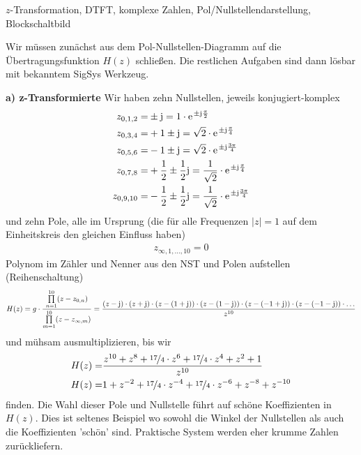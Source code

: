 \begin{Werkzeug}
$z$-Transformation, DTFT, komplexe Zahlen, Pol/Nullstellendarstellung, Blockschaltbild
\end{Werkzeug}
\begin{Ansatz}
Wir müssen zunächst aus dem
Pol-Nullstellen-Diagramm auf die Übertragungsfunktion $H(z)$ schließen. Die
restlichen Aufgaben sind dann lösbar mit bekanntem SigSys Werkzeug.
\end{Ansatz}
%
\begin{ExCalc}
%
\textbf{a) z-Transformierte}
%
Wir haben zehn Nullstellen, jeweils konjugiert-komplex
\begin{align}
z_{0,1,2} =& \pm \im = 1 \cdot \e^{\pm \im \frac{\pi}{2}}\\
z_{0,3,4} =& +1 \pm \im =  \sqrt{2} \cdot \e^{\pm \im \frac{\pi}{4}}\\
z_{0,5,6} =& -1 \pm \im = \sqrt{2} \cdot \e^{\pm \im \frac{3\pi}{4}}\\
z_{0,7,8} =& +\frac{1}{2} \pm \frac{1}{2}\im = \frac{1}{\sqrt{2}} \cdot \e^{\pm \im \frac{\pi}{4}}\\
z_{0,9,10} =& -\frac{1}{2} \pm \frac{1}{2}\im = \frac{1}{\sqrt{2}} \cdot \e^{\pm \im \frac{3\pi}{4}}
\end{align}
und zehn Pole, alle im Ursprung (die für alle Frequenzen $|z|=1$ auf dem
Einheitskreis den gleichen Einfluss haben)
\begin{align}
z_{\infty,1,...,10} = 0
\end{align}
Polynom im Zähler und Nenner aus den NST und Polen aufstellen (Reihenschaltung)
\begin{align}
H(z) = g\cdot
\frac
{\prod\limits_{n=1}^{10} (z-z_{0,n})}
{\prod\limits_{m=1}^{10} (z-z_{\infty,m})} =
\frac{
(z-\im)\cdot
(z+\im)\cdot
(z-(1 + \im))\cdot
(z-(1 - \im))\cdot
(z-(-1 + \im))\cdot
(z-(-1 - \im))\cdot
\dots
}{z^{10}}
\end{align}
und mühsam ausmultiplizieren, bis wir
\begin{align}
H(z) =& \frac{z^{10} + z^8    + \nicefrac{17}{4}\cdot z^6     + \nicefrac{17}{4}\cdot z^4    + z^2    + 1}{z^{10}}\\
H(z) =& 1            + z^{-2} + \nicefrac{17}{4}\cdot z^{-4}  + \nicefrac{17}{4}\cdot z^{-6} + z^{-8} + z^{-10}
\end{align}
finden.
%
Die Wahl dieser Pole und Nullstelle führt auf schöne Koeffizienten in
$H(z)$. Dies ist seltenes Beispiel wo sowohl die Winkel der Nullstellen als auch
die Koeffizienten 'schön' sind. Praktische System werden eher krumme Zahlen
zurückliefern.
%


\end{ExCalc}
